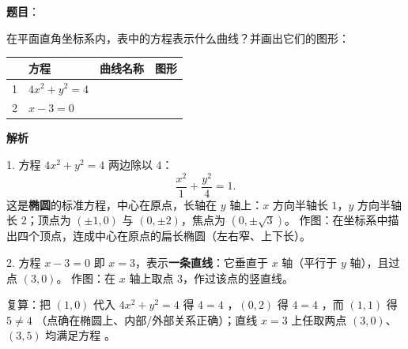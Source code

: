 \begin{answer}

\textbf{题目}：

在平面直角坐标系内，表中的方程表示什么曲线？并画出它们的图形：

\begin{center}
\begin{tabular}{clll}
\toprule
 & 方程 & 曲线名称 & 图形 \\
\midrule
1 & $4x^2+y^2=4$ &  &  \\
2 & $x-3=0$ &  &  \\
\bottomrule
\end{tabular}
\end{center}

\textbf{解析}

1. 方程 $4x^2+y^2=4$ 两边除以 $4$：
\nopagebreak[4]
\[
\frac{x^2}{1}+\frac{y^2}{4}=1.
\]
这是\textbf{椭圆}的标准方程，中心在原点，长轴在 $y$ 轴上：$x$ 方向半轴长 $1$，$y$ 方向半轴长 $2$；顶点为 $(\pm1,0)$ 与 $(0,\pm2)$，焦点为 $(0,\pm\sqrt3)$。
作图：在坐标系中描出四个顶点，连成中心在原点的扁长椭圆（左右窄、上下长）。

2. 方程 $x-3=0$ 即 $x=3$，表示\textbf{一条直线}：它垂直于 $x$ 轴（平行于 $y$ 轴），且过点 $(3,0)$。
作图：在 $x$ 轴上取点 $3$，作过该点的竖直线。

复算：把 $(1,0)$ 代入 $4x^2+y^2=4$ 得 $4=4$ ，$(0,2)$ 得 $4=4$ ，而 $(1,1)$ 得 $5\ne4$ （点确在椭圆上、内部/外部关系正确）；直线 $x=3$ 上任取两点 $(3,0)$、$(3,5)$ 均满足方程 。


\end{answer}
